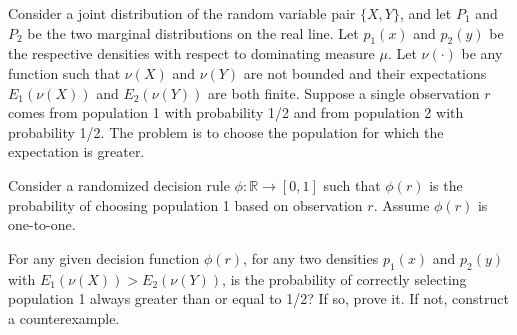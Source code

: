 \begin{exercise}\label{probability:2025:2}
Consider a joint distribution of the random variable pair $\{X,Y\}$, and let $P_1$ and $P_2$ be the two marginal distributions on the real line. Let $p_1(x)$ and $p_2(y)$ be the respective densities with respect to dominating measure $\mu$. Let $\nu(\cdot)$ be any function such that $\nu(X)$ and $\nu(Y)$ are not bounded and their expectations $E_1(\nu(X))$ and $E_2(\nu(Y))$ are both finite. Suppose a single observation $r$ comes from population 1 with probability 1/2 and from population 2 with probability 1/2. The problem is to choose the population for which the expectation is greater.

Consider a randomized decision rule $\phi: \mathbb{R} \to [0,1]$ such that $\phi(r)$ is the probability of choosing population 1 based on observation $r$. Assume $\phi(r)$ is one-to-one.

For any given decision function $\phi(r)$, for any two densities $p_1(x)$ and $p_2(y)$ with $E_1(\nu(X)) > E_2(\nu(Y))$, is the probability of correctly selecting population 1 always greater than or equal to 1/2? If so, prove it. If not, construct a counterexample.

\end{exercise}

